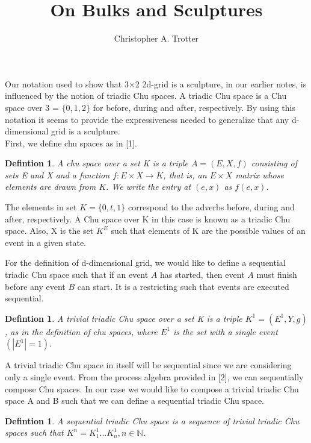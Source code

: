 \documentclass[a4paper,11pt]{article}
\newtheorem{definition}[theorem]{Defintion}
\begin{document}
\title{On Bulks and Sculptures}

\author{Christopher A. Trotter}

\maketitle

Our notation used to show that 3$\times$2 2d-grid is a sculpture, in our earlier notes, is influenced by the notion of triadic Chu spaces. A triadic Chu space is a Chu space over 3 = $\{0, 1, 2\}$ for before, during and after, respectively.  By using this notation it seems to provide the expressiveness needed to generalize that any d-dimensional grid is a sculpture.\\

First, we define chu spaces as in [1].

\begin{definition}
   A chu space over a set K is a triple $A=(E, X, f)$ consisting of sets E and X and a function $f: E \times X \to K$, that is, an $E \times X$ matrix whose elements are drawn from $K$. We write the entry at $(e,x)$ as $f(e,x)$.
\end{definition}

The elements in set $K=\{0, t, 1\}$ correspond to the adverbs before, during and after, respectively. A Chu space over K in this case is known as a triadic Chu space. Also, X is the set $K^{E}$ such that elements of K are the possible values of an event in a given state.

For the definition of d-dimensional grid, we would like to define a sequential triadic Chu space such that if an event $A$ has started, then event $A$ must finish before any event $B$ can start. It is a restricting such that events are executed sequential.

\begin{definition}
   A trivial triadic Chu space over a set K is a triple $K^{1}=(E^{1}, Y, g)$, as in the definition of chu spaces, where $E^{1}$ is the set with a single event $(|E^{1}| = 1)$.
\end{definition}

A trivial triadic Chu space in itself will be sequential since we are considering only a single event. From the process algebra provided in [2], we can sequentially compose Chu spaces. In our case we would like to compose a trivial triadic Chu space A and B
such that we can define a sequential triadic Chu space.

\begin{definition}
    A sequential triadic Chu space is a sequence of trivial triadic Chu spaces such that $K^{n}=K^{1}_{1}...K^{1}_{n}, n \in \mathbb{N}$.
\end{definition}
\end{document}
